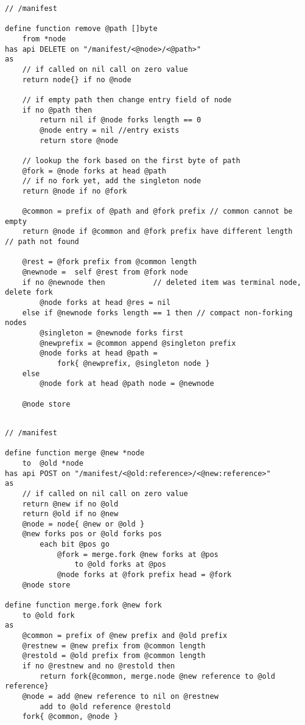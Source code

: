 \begin{definition}\label{def:manifest-remove}
\begin{lstlisting}[language=buzz1]
// /manifest

define function remove @path []byte 
    from *node
has api DELETE on "/manifest/<@node>/<@path>"
as
    // if called on nil call on zero value
    return node{} if no @node 

    // if empty path then change entry field of node
    if no @path then
        return nil if @node forks length == 0 
        @node entry = nil //entry exists
        return store @node

    // lookup the fork based on the first byte of path
    @fork = @node forks at head @path
    // if no fork yet, add the singleton node 
    return @node if no @fork

    @common = prefix of @path and @fork prefix // common cannot be empty
    return @node if @common and @fork prefix have different length          // path not found
    
    @rest = @fork prefix from @common length
    @newnode =  self @rest from @fork node               
    if no @newnode then           // deleted item was terminal node, delete fork 
        @node forks at head @res = nil
    else if @newnode forks length == 1 then // compact non-forking nodes 
        @singleton = @newnode forks first
        @newprefix = @common append @singleton prefix
        @node forks at head @path = 
            fork{ @newprefix, @singleton node }
    else
        @node fork at head @path node = @newnode
        
    @node store
    

\end{lstlisting}
\end{definition}


\begin{definition}\label{def:manifest-merge}
\begin{lstlisting}[language=buzz1]
// /manifest

define function merge @new *node  
    to  @old *node 
has api POST on "/manifest/<@old:reference>/<@new:reference>"
as
    // if called on nil call on zero value
    return @new if no @old
    return @old if no @new
    @node = node{ @new or @old } 
    @new forks pos or @old forks pos 
        each bit @pos go 
            @fork = merge.fork @new forks at @pos
                to @old forks at @pos
            @node forks at @fork prefix head = @fork 
    @node store 

define function merge.fork @new fork 
    to @old fork    
as
    @common = prefix of @new prefix and @old prefix 
    @restnew = @new prefix from @common length
    @restold = @old prefix from @common length
    if no @restnew and no @restold then  
        return fork{@common, merge.node @new reference to @old reference}
    @node = add @new reference to nil on @restnew 
        add to @old reference @restold
    fork{ @common, @node }
         
\end{lstlisting}
\end{definition}
